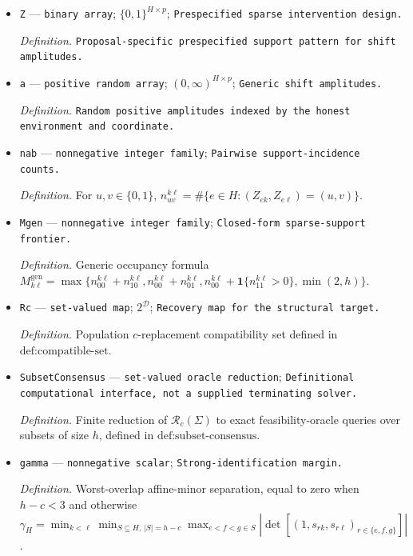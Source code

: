 \documentclass{article}
\begin{document}
\begin{itemize}
  \item \texttt{Z} --- \texttt{binary array}; \(\{0,1\}^{H\times p}\); \texttt{Prespecified sparse intervention design.}
  \par\smallskip\noindent\emph{Definition.} \texttt{Proposal-\allowbreak{}specific prespecified support pattern for shift amplitudes.}
  \item \texttt{a} --- \texttt{positive random array}; \((0,\infty)^{H\times p}\); \texttt{Generic shift amplitudes.}
  \par\smallskip\noindent\emph{Definition.} \texttt{Random positive amplitudes indexed by the honest environment and coordinate.}
  \item \texttt{nab} --- \texttt{nonnegative integer family}; \texttt{Pairwise support-\allowbreak{}incidence counts.}
  \par\smallskip\noindent\emph{Definition.} For \(u,v\in\{0,1\}\), \(n_{uv}^{k\ell}=\#\{e\in H:(Z_{ek},Z_{e\ell})=(u,v)\}\).
  \item \texttt{Mgen} --- \texttt{nonnegative integer family}; \texttt{Closed-\allowbreak{}form sparse-\allowbreak{}support frontier.}
  \par\smallskip\noindent\emph{Definition.} Generic occupancy formula \(M_{k\ell}^{\mathrm{gen}}=\max\{n_{00}^{k\ell}+n_{10}^{k\ell},n_{00}^{k\ell}+n_{01}^{k\ell},n_{00}^{k\ell}+\mathbf 1\{n_{11}^{k\ell}>0\},\min(2,h)\}\).
  \item \texttt{Rc} --- \texttt{set-\allowbreak{}valued map}; \(2^{\mathcal D}\); \texttt{Recovery map for the structural target.}
  \par\smallskip\noindent\emph{Definition.} Population \(c\)-replacement compatibility set defined in \(\text{def:compatible-set}\).
  \item \texttt{SubsetConsensus} --- \texttt{set-\allowbreak{}valued oracle reduction}; \texttt{Definitional computational interface,\allowbreak{} not a supplied terminating solver.}
  \par\smallskip\noindent\emph{Definition.} Finite reduction of \(\mathcal R_c(\Sigma)\) to exact feasibility-oracle queries over subsets of size \(h\), defined in \(\text{def:subset-consensus}\).
  \item \texttt{gamma} --- \texttt{nonnegative scalar}; \texttt{Strong-\allowbreak{}identification margin.}
  \par\smallskip\noindent\emph{Definition.} Worst-overlap affine-minor separation, equal to zero when \(h-c<3\) and otherwise \(\gamma_H=\min_{k<\ell}\min_{S\subseteq H,\,|S|=h-c}\max_{e<f<g\in S}|\det[(1,s_{rk},s_{r\ell})_{r\in\{e,f,g\}}]|\).

\end{itemize}
\end{document}
